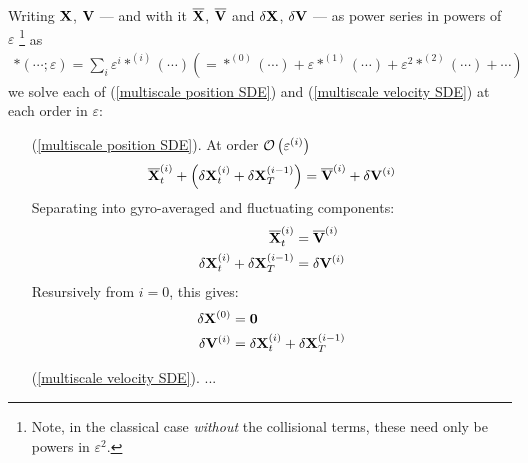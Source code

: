     Writing $\mathbf{X}$, $\mathbf{V}$ — and with it $\overline{\mathbf{X}}$, $\overline{\mathbf{V}}$ and $\delta\mathbf{X}$, $\delta\mathbf{V}$ — as power series in powers of $\varepsilon$ \footnote{Note, in the classical case \emph{without} the collisional terms, these need only be powers in $\varepsilon^{2}$.} as
    \begin{align}
        *(\cdots; \varepsilon)  =  \sum_{i}\varepsilon^{i}*^{(i)}(\cdots)  \left(=  *^{(0)}(\cdots) + \varepsilon*^{(1)}(\cdots) + \varepsilon^{2}*^{(2)}(\cdots) + \cdots\right)
    \end{align}
    we solve each of (\ref{multiscale position SDE}) and (\ref{multiscale velocity SDE}) at each order in $\varepsilon$: 
    \begin{itemize}
        \item[(\ref{multiscale position SDE}).]  At order $\mathcal{O}\left(\varepsilon^{(i)}\right)$
        \begin{equation}
            \overline{\mathbf{X}}^{(i)}_{t} + \left(\delta\mathbf{X}^{(i)}_{t} + \delta\mathbf{X}^{(i - 1)}_{T}\right)  =  \overline{\mathbf{V}}^{(i)} + \delta\mathbf{V}^{(i)}
        \end{equation}
        Separating into gyro-averaged and fluctuating components:
        \begin{align}
            \overline{\mathbf{X}}^{(i)}_{t}  &=  \overline{\mathbf{V}}^{(i)}  \\
            \delta\mathbf{X}^{(i)}_{t} + \delta\mathbf{X}^{(i - 1)}_{T}  &=  \delta\mathbf{V}^{(i)}
        \end{align}
        Resursively from $i = 0$, this gives:
        \begin{align}
            \delta\mathbf{X}^{(0)}  &=  \mathbf{0}  \\
            \delta\mathbf{V}^{(i)}  &=  \delta\mathbf{X}^{(i)}_{t} + \delta\mathbf{X}^{(i - 1)}_{T}
        \end{align}
        
        \item[(\ref{multiscale velocity SDE}).]  ...
    \end{itemize}